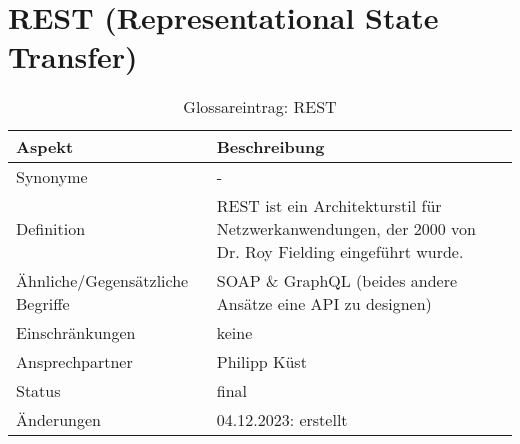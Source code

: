 \section*{REST (Representational State Transfer)}\label{sec:glossar_rest}
\begin{table}[H]
    \label{tab:glossar_rest}
    \begin{tabularx}{\textwidth}{|l|X|}
        \hline
        \textbf{Aspekt}                  & \textbf{Beschreibung}                                                                                 \\
        \hline
        Synonyme                         & -                                                                                                     \\
        \hline
        Definition                       & REST ist ein Architekturstil für Netzwerkanwendungen, der 2000 von Dr. Roy Fielding eingeführt wurde. \\
        \hline
        Ähnliche/Gegensätzliche Begriffe & SOAP \& GraphQL (beides andere Ansätze eine API zu designen)                                          \\
        \hline
        Einschränkungen                  & keine                                                                                                 \\
        \hline
        Ansprechpartner                  & Philipp Küst                                                                                          \\
        \hline
        Status                           & final                                                                                                 \\
        \hline
        Änderungen                       & 04.12.2023: erstellt                                                                                  \\
        \hline
    \end{tabularx}
    \caption{Glossareintrag: REST}
\end{table}